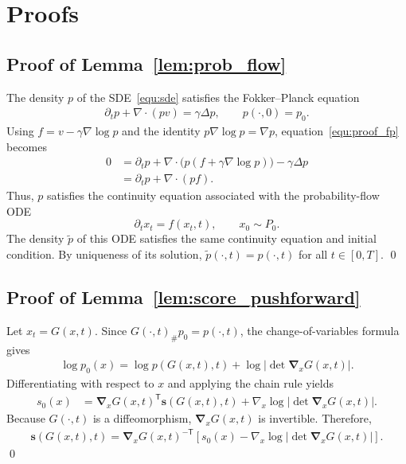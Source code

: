 \documentclass[preprint]{elsarticle}
\newcommand{\g}{\gamma}
\begin{document}
{\footnotesize
}

\appendix

\section{Proofs}\label{sec:appendix_proofs}
\subsection{Proof of Lemma~\ref{lem:prob_flow}}
\label{sec:proof_prob_flow}

The density $p$ of the SDE~\eqref{equ:sde} satisfies the Fokker--Planck equation
\begin{align}
    \partial_t p+\nabla\!\cdot(pv)=\g\Delta p,
    \qquad
    p(\cdot,0)=p_0.
    \label{equ:proof_fp}
\end{align}
Using $f=v-\g\nabla\log p$ and the identity $p\nabla\log p=\nabla p$, equation~\eqref{equ:proof_fp} becomes
\begin{align*}
    0
    &=\partial_t p+\nabla\!\cdot
      \bigl(p(f+\g\nabla\log p)\bigr)-\g\Delta p \\
    &=\partial_t p+\nabla\!\cdot(pf).
\end{align*}
Thus, $p$ satisfies the continuity equation associated with the probability-flow ODE
\[
    \partial_t x_t=f(x_t,t),
    \qquad
    x_0\sim P_0.
\]
The density $\tilde p$ of this ODE satisfies the same continuity equation and initial condition. By uniqueness of its solution, $\tilde p(\cdot,t)=p(\cdot,t)$ for all $t\in[0,T]$.
\qed


\subsection{Proof of Lemma~\ref{lem:score_pushforward}}
\label{sec:proof_score_pushforward}

Let $x_t=G(x,t)$. Since $G(\cdot,t)_\#p_0=p(\cdot,t)$, the change-of-variables formula gives
\begin{align}
    \log p_0(x)
    =
    \log p(G(x,t),t)
    +
    \log\left|\det\boldsymbol{\nabla}_xG(x,t)\right|.
    \label{equ:proof_change_variables}
\end{align}
Differentiating with respect to $x$ and applying the chain rule yields
\begin{align*}
    s_0(x)
    &=
    \boldsymbol{\nabla}_xG(x,t)^{\mathsf T}
    \mathbf{s}(G(x,t),t)
    +
    \nabla_x
    \log\left|\det\boldsymbol{\nabla}_xG(x,t)\right|.
\end{align*}
Because $G(\cdot,t)$ is a diffeomorphism, $\boldsymbol{\nabla}_xG(x,t)$ is invertible. Therefore,
\begin{align*}
    \mathbf{s}(G(x,t),t)
    =
    \boldsymbol{\nabla}_xG(x,t)^{-\mathsf T}
    \left[
        s_0(x)
        -
        \nabla_x
        \log\left|\det\boldsymbol{\nabla}_xG(x,t)\right|
    \right].
\end{align*}
\qed
\end{document}
